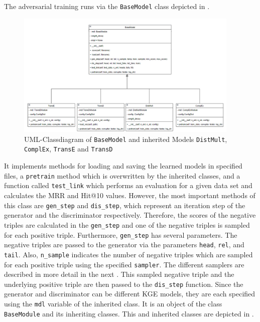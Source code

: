 The adversarial training runs via the \texttt{BaseModel} class depicted in .
\begin{figure}[t]
  \centering
    \includegraphics[width=0.95\textwidth]{figures/BaseModel.png}
  \caption{\ac{UML}-Classdiagram of \texttt{BaseModel} and inherited Models  \texttt{DistMult},  \texttt{ComplEx},  \texttt{TransE} and  \texttt{TransD}}
  \label{fig:basemodel_classdiagram}
\end{figure}
It implements methods for loading and saving the learned models in specified files, a \texttt{pretrain} method which is overwritten by the inherited classes, and a function called \texttt{test\_link} which performs an evaluation for a given data set and calculates the MRR and Hit@10 values.
However, the most important methods of this class are \texttt{gen\_step} and \texttt{dis\_step}, which represent an iteration step of the generator and the discriminator respectively.
Therefore, the scores of the negative triples are calculated in the \texttt{gen\_step} and one of the negative triples is sampled for each positive triple.
Furthermore, \texttt{gen\_step} has several parameters.
The negative triples are passed to the generator via the parameters \texttt{head}, \texttt{rel}, and \texttt{tail}.
Also, \texttt{n\_sample} indicates the number of negative triples which are sampled for each positive triple using the specified \texttt{sampler}.
The different samplers are described in more detail in the next .
This sampled negative triple and the underlying positive triple are then passed to the \texttt{dis\_step} function.
Since the generator and discriminator can be different KGE models, they are each specified using the \texttt{mdl} variable of the inherited class.
It is an object of the class \texttt{BaseModule} and its inheriting classes.
This and inherited classes are depicted in .
